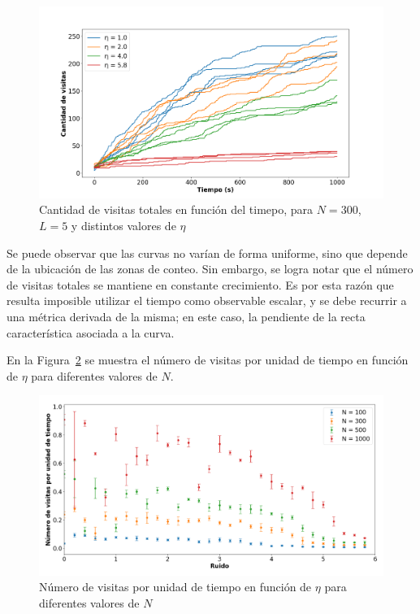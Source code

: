 \documentclass[11pt, a4paper]{article}
\begin{document}
            \begin{figure}[H]
                \centering
                \includegraphics[width=\textwidth]{./visits_vs_time_obc-n300}
                \caption{Cantidad de visitas totales en función del timepo, para $N = 300$, $L = 5$ y distintos valores de $\eta$}
                \label{fig:visitas_obc_2}
            \end{figure}

            Se puede observar que las curvas no varían de forma uniforme, sino que depende de la ubicación de las zonas de conteo.
            Sin embargo, se logra notar que el número de visitas totales se mantiene en constante crecimiento.
            Es por esta razón que resulta imposible utilizar el tiempo como observable escalar, y se debe recurrir a una
            métrica derivada de la misma; en este caso, la pendiente de la recta característica asociada a la curva.

            En la Figura~\ref{fig:visitas_obc_3} se muestra el número de visitas por unidad de tiempo en función de
            $\eta$ para diferentes valores de $N$.

            \begin{figure}[H]
                \centering
                \includegraphics[width=\textwidth]{./slope_vs_eta-obc}
                \caption{Número de visitas por unidad de tiempo en función de $\eta$ para diferentes valores de $N$}
                \label{fig:visitas_obc_3}
            \end{figure}
\end{document}
